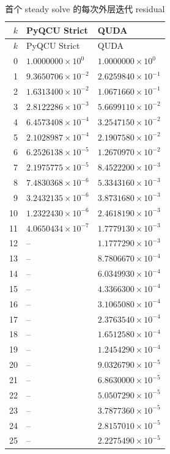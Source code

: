 \documentclass[UTF8,a4paper,11pt]{ctexart}
\begin{document}
\begin{longtable}{@{}rll@{}}
\caption{首个 steady solve 的每次外层迭代 residual}\label{tab:residual-trace}\\
\toprule
$k$ & PyQCU Strict & QUDA \\
\midrule
\endfirsthead
\toprule
$k$ & PyQCU Strict & QUDA \\
\midrule
\endhead
0 & $1.0000000\times10^{0}$ & $1.0000000\times10^{0}$ \\
1 & $9.3650706\times10^{-2}$ & $2.6259840\times10^{-1}$ \\
2 & $1.6313400\times10^{-2}$ & $1.0671660\times10^{-1}$ \\
3 & $2.8122286\times10^{-3}$ & $5.6699110\times10^{-2}$ \\
4 & $6.4573408\times10^{-4}$ & $3.2547150\times10^{-2}$ \\
5 & $2.1028987\times10^{-4}$ & $2.1907580\times10^{-2}$ \\
6 & $6.2526138\times10^{-5}$ & $1.2670970\times10^{-2}$ \\
7 & $2.1975775\times10^{-5}$ & $8.4522200\times10^{-3}$ \\
8 & $7.4830368\times10^{-6}$ & $5.3343160\times10^{-3}$ \\
9 & $3.2432135\times10^{-6}$ & $3.8731680\times10^{-3}$ \\
10 & $1.2322430\times10^{-6}$ & $2.4618190\times10^{-3}$ \\
11 & $4.0650434\times10^{-7}$ & $1.7779130\times10^{-3}$ \\
12 & -- & $1.1777290\times10^{-3}$ \\
13 & -- & $8.7806670\times10^{-4}$ \\
14 & -- & $6.0349930\times10^{-4}$ \\
15 & -- & $4.3366300\times10^{-4}$ \\
16 & -- & $3.1065080\times10^{-4}$ \\
17 & -- & $2.3763540\times10^{-4}$ \\
18 & -- & $1.6512580\times10^{-4}$ \\
19 & -- & $1.2454290\times10^{-4}$ \\
20 & -- & $9.0326790\times10^{-5}$ \\
21 & -- & $6.8630000\times10^{-5}$ \\
22 & -- & $5.0507290\times10^{-5}$ \\
23 & -- & $3.7877360\times10^{-5}$ \\
24 & -- & $2.8157010\times10^{-5}$ \\
25 & -- & $2.2275490\times10^{-5}$ \\

\end{longtable}
\end{document}

